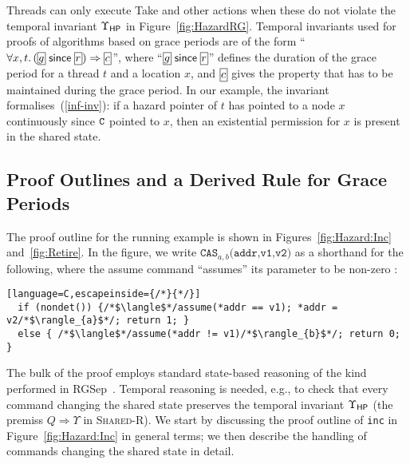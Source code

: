 
Threads can only execute {\sf Take} and other actions when these do not violate
the temporal invariant $\Upsilon_{\sf HP}$ in Figure~\ref{fig:HazardRG}.
Temporal invariants used for proofs of algorithms based on grace periods are of
the form ``$\forall x, t.\, (\shareds{g} \since \shareds{r}) \Rightarrow
\shareds{c}$'', where
``$\shareds{g} \since \shareds{r}$'' defines the duration of the grace period for
a thread $t$ and a location $x$, and $\shareds{c}$ gives the
property that has to be maintained during the grace period.  In
our example, the invariant formalises~(\ref{inf-inv}): if
a hazard pointer of $t$ has pointed to a node $x$ continuously since
$\texttt{C}$ pointed to $x$, then an existential permission for $x$ is present in the
shared state.



\subsection{Proof Outlines and a Derived Rule for Grace Periods\label{sec:outlines}}


The proof outline for the running example is shown in
Figures~\ref{fig:Hazard:Inc} and~\ref{fig:Retire}.
In the figure, we write $\texttt{CAS}_{a, b}\texttt{(addr,v1,v2)}$ as a shorthand for the following,
where the {\sf assume} command ``assumes'' its parameter to be non-zero
\tra{\ref{app:formal}}{\nformal}:
\begin{flushleft}
\small
\begin{lstlisting}[language=C,escapeinside={/*}{*/}]
  if (nondet()) {/*$\langle$*/assume(*addr == v1); *addr = v2/*$\rangle_{a}$*/; return 1; } 
  else { /*$\langle$*/assume(*addr != v1)/*$\rangle_{b}$*/; return 0; }
\end{lstlisting}
\end{flushleft}

The bulk of the proof employs standard state-based reasoning of the kind
performed in RGSep~\cite{rgsep}. Temporal reasoning
is needed, e.g., to check that every command changing the
shared state preserves the temporal invariant $\Upsilon_{\sf HP}$ (the premiss
$Q \Rightarrow \Upsilon$ in \textsc{Shared-R}).  We start by discussing the
proof outline of {\tt inc} in Figure~\ref{fig:Hazard:Inc} in general terms; we
then describe the handling of commands changing the shared state in detail. 

